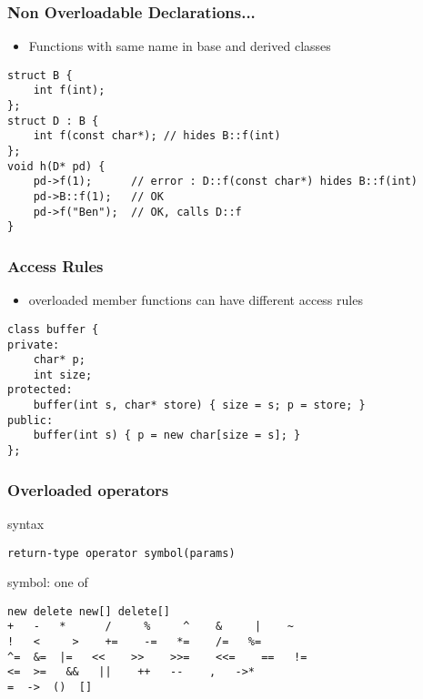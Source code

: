 \documentclass{beamer}
\begin{document}
\begin{frame}[fragile]
\frametitle{Non Overloadable Declarations...}

\begin{itemize}
\item Functions with same name in base and derived classes
\end{itemize}

\begin{example}
\begin{lstlisting}
struct B {
    int f(int);
};
struct D : B {
    int f(const char*); // hides B::f(int)
};
void h(D* pd) {
    pd->f(1);      // error : D::f(const char*) hides B::f(int)
    pd->B::f(1);   // OK
    pd->f("Ben");  // OK, calls D::f
}
\end{lstlisting}
\end{example}
\end{frame}


\begin{frame}[fragile]
\frametitle{Access Rules}
\begin{itemize}
\item overloaded member functions can have different access rules
\end{itemize}

\begin{example}
\begin{lstlisting}
class buffer {
private:
    char* p;
    int size;
protected:
    buffer(int s, char* store) { size = s; p = store; }
public:
    buffer(int s) { p = new char[size = s]; }
};
\end{lstlisting}
\end{example}
\end{frame}


\begin{frame}[fragile]
\frametitle{Overloaded operators}

\begin{block}{syntax}
\begin{lstlisting}
return-type operator symbol(params)
\end{lstlisting}
\end{block}

\begin{block}{symbol: one of}
\begin{lstlisting}
new delete new[] delete[]
+   -   *      /     %     ^    &     |    ~
!   <     >    +=    -=   *=    /=   %=  
^=  &=  |=   <<    >>    >>=    <<=    ==   !=
<=  >=   &&   ||    ++   --    ,   ->*    
=  ->  ()  []
\end{lstlisting}
\end{block}

\end{frame}
\end{document}
